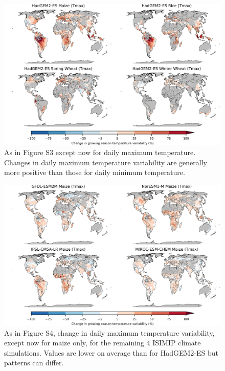\documentclass[12pt]{article}
\begin{document}
\begin{figure}[h!]
  \centering
  \includegraphics[width = 14cm]{HadGEM2-ES_var_change_max.png}
  \caption{
  As in Figure S3 except now for daily maximum temperature. Changes in daily maximum temperature variability are generally more positive than those for daily minimum temperature.
  }
  \label{fig:var}
\end{figure}

\begin{figure}[h!]
  \centering
  \includegraphics[width = 14cm]{other_models_var_change_max.png}
  \caption{
  As in Figure S4, change in daily maximum temperature variability, except now for maize only, for the remaining 4 ISIMIP climate simulations. Values are lower on average than for HadGEM2-ES but patterns can differ.
  }
  \label{fig:var}
\end{figure}


\clearpage
\end{document}
